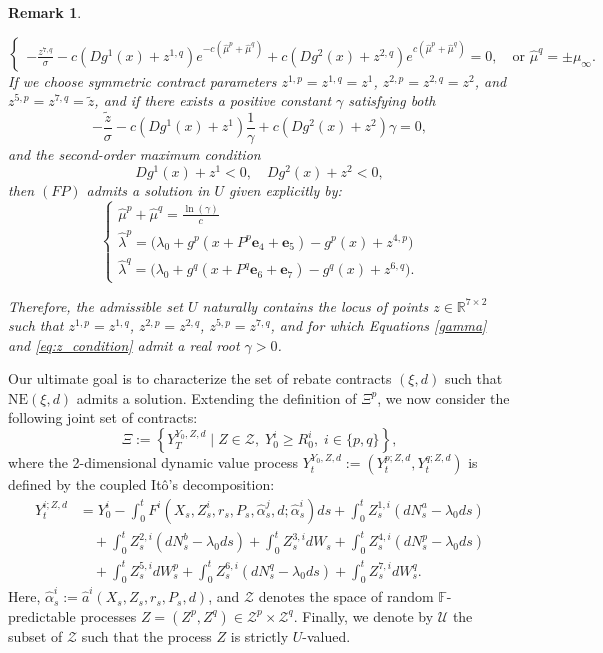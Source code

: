 \documentclass[12pt]{article}
\newtheorem{remark}[theorem2]{Remark}
\begin{document}
\begin{remark}
\begin{enumerate}
\[\begin{cases}
    -\frac{z^{7,q}}{\sigma} - c(Dg^1(x)+z^{1,q})e^{-c(\hat{\mu}^p + \hat{\mu}^q)} + c(Dg^2(x)+z^{2,q})e^{c(\hat{\mu}^p + \hat{\mu}^q)} = 0, \quad \text{or } \hat{\mu}^q = \pm \mu_{\infty}.
    \end{cases}
    \]
    If we choose symmetric contract parameters $z^{1,p} = z^{1,q} = z^1$, $z^{2,p} = z^{2,q} = z^2$, and $z^{5,p} = z^{7,q} = \tilde{z}$, and if there exists a positive constant $\gamma$ satisfying both
    \begin{equation}\label{gamma}
    -\frac{\tilde{z}}{\sigma} - c(Dg^1(x)+z^{1})\frac{1}{\gamma} + c(Dg^2(x)+z^{2})\gamma = 0,
    \end{equation}
    and the second-order maximum condition
    \begin{equation}\label{eq:z_condition} 
    Dg^1(x)+z^{1} < 0, \quad Dg^2(x)+z^{2} < 0,
    \end{equation}
    then $(FP)$ admits a solution in $U$ given explicitly by:
    \[ 
    \begin{cases}
    \hat{\mu}^p + \hat{\mu}^q = \frac{\ln(\gamma)}{c} \\
    \hat{\lambda}^p = \big( \lambda_0 + g^p(x + P^p\mathbf{e}_4 + \mathbf{e}_5) - g^p(x) + z^{4,p} \big) \\
    \hat{\lambda}^q = \big( \lambda_0 + g^q(x + P^q\mathbf{e}_6 + \mathbf{e}_7) - g^q(x) + z^{6,q} \big).
    \end{cases}
    \]
\end{enumerate}
Therefore, the admissible set $U$ naturally contains the locus of points $z \in \mathbb{R}^{7 \times 2}$ such that $z^{1,p} = z^{1,q}$, $z^{2,p} = z^{2,q}$, $z^{5,p} = z^{7,q}$, and for which Equations \eqref{gamma} and \eqref{eq:z_condition} admit a real root $\gamma > 0$. 
\end{remark}

Our ultimate goal is to characterize the set of rebate contracts $(\xi,d)$ such that $\text{NE}(\xi,d)$ admits a solution. Extending the definition of $\Xi^p$, we now consider the following joint set of contracts:
\[ \Xi := \left\{ Y_T^{Y_0, Z, d} \;\big|\; Z \in \mathcal{Z}, \; Y_0^i \geq R_0^i, \; i \in \{p,q\} \right\}, \]
where the 2-dimensional dynamic value process $Y_t^{Y_0, Z, d} := (Y_t^{p; Z,d}, Y_t^{q; Z,d})$ is defined by the coupled It\^o's decomposition:
\begin{align*}
    Y^{i;Z,d}_t &= Y^i_0 - \int_0^t F^i(X_s, Z_s^i, r_s, P_s, \hat{\alpha}^j_s, d; \hat{\alpha}^i_s) ds + \int_0^t Z^{1,i}_s (dN^{a}_s - \lambda_0 ds) \\
    &\quad + \int_0^t Z^{2,i}_s (dN^{b}_s - \lambda_0 ds) + \int_0^t Z^{3,i}_s dW_s + \int_0^t Z^{4,i}_s (dN^p_s - \lambda_0 ds) \\
    &\quad + \int_0^t Z^{5,i}_s dW^{p}_s + \int_0^t Z^{6,i}_s (dN^{q}_s - \lambda_0 ds) + \int_0^t Z^{7,i}_s dW^{q}_s.
\end{align*} 
Here, $\hat{\alpha}^i_s := \hat{a}^i(X_s, Z_s, r_s, P_s, d)$, and $\mathcal{Z}$ denotes the space of random $\mathbb{F}$-predictable processes $Z = (Z^p, Z^q) \in \mathcal{Z}^p \times \mathcal{Z}^q$. Finally, we denote by $\mathcal{U}$ the subset of $\mathcal{Z}$ such that the process $Z$ is strictly $U$-valued.
\end{document}
